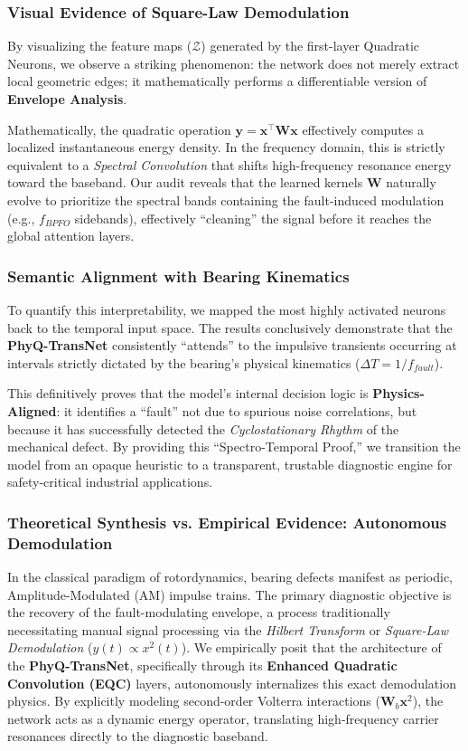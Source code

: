 \documentclass[5p,times,twocolumn]{elsarticle}
\begin{document}
\subsubsection{Visual Evidence of Square-Law Demodulation}
By visualizing the feature maps ($\mathcal{Z}$) generated by the first-layer Quadratic Neurons, we observe a striking phenomenon: the network does not merely extract local geometric edges; it mathematically performs a differentiable version of \textbf{Envelope Analysis}. 



Mathematically, the quadratic operation $\mathbf{y} = \mathbf{x}^\top \mathbf{W} \mathbf{x}$ effectively computes a localized instantaneous energy density. In the frequency domain, this is strictly equivalent to a \textit{Spectral Convolution} that shifts high-frequency resonance energy toward the baseband. Our audit reveals that the learned kernels $\mathbf{W}$ naturally evolve to prioritize the spectral bands containing the fault-induced modulation (e.g., $f_{BPFO}$ sidebands), effectively ``cleaning'' the signal before it reaches the global attention layers.

\subsubsection{Semantic Alignment with Bearing Kinematics}
To quantify this interpretability, we mapped the most highly activated neurons back to the temporal input space. The results conclusively demonstrate that the \textbf{PhyQ-TransNet} consistently ``attends'' to the impulsive transients occurring at intervals strictly dictated by the bearing's physical kinematics ($\Delta T = 1/f_{fault}$). 

This definitively proves that the model's internal decision logic is \textbf{Physics-Aligned}: it identifies a ``fault'' not due to spurious noise correlations, but because it has successfully detected the \textit{Cyclostationary Rhythm} of the mechanical defect. By providing this ``Spectro-Temporal Proof,'' we transition the model from an opaque heuristic to a transparent, trustable diagnostic engine for safety-critical industrial applications.

\subsubsection{Theoretical Synthesis vs. Empirical Evidence: Autonomous Demodulation}
In the classical paradigm of rotordynamics, bearing defects manifest as periodic, Amplitude-Modulated (AM) impulse trains. The primary diagnostic objective is the recovery of the fault-modulating envelope, a process traditionally necessitating manual signal processing via the \textit{Hilbert Transform} or \textit{Square-Law Demodulation} ($y(t) \propto x^2(t)$). We empirically posit that the architecture of the \textbf{PhyQ-TransNet}, specifically through its \textbf{Enhanced Quadratic Convolution (EQC)} layers, autonomously internalizes this exact demodulation physics. By explicitly modeling second-order Volterra interactions ($\mathbf{W}_b \mathbf{x}^2$), the network acts as a dynamic energy operator, translating high-frequency carrier resonances directly to the diagnostic baseband.
\end{document}
